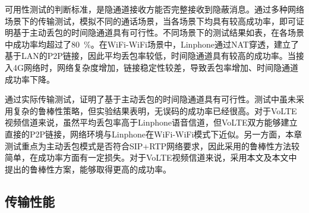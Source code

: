 
可用性测试的判断标准，是隐通道接收方能否完整接收到隐蔽消息。通过多种网络场景下的传输测试，模拟不同的通话场景，当各场景下均具有较高成功率，即可证明基于主动丢包的时间隐通道具有可行性。不同场景下的测试结果如表，在各场景中成功率均超过了{80\ \%}。在WiFi-WiFi场景中，Linphone通过NAT穿透，建立了基于LAN的P2P链接，因此平均丢包率较低，时间隐通道具有较高的成功率。当接入4G网络时，网络复杂度增加，链接稳定性较差，导致丢包率增加、时间隐通道成功率下降。

通过实际传输测试，证明了基于主动丢包的时间隐通道具有可行性。测试中虽未采用复杂的鲁棒性策略，但实验结果表明，无误码的成功率已经很高。对于VoLTE视频信道来说，虽然平均丢包率高于Linphone语音信道，但VoLTE双方能够建立直接的P2P链接，网络环境与Linphone在WiFi-WiFi模式下近似。另一方面，本章测试重点为主动丢包模式是否符合SIP+RTP网络要求，因此采用的鲁棒性方法较简单，在成功率方面有一定损失。对于VoLTE视频信道来说，采用本文及本文中提出的鲁棒性方案，能够取得更高的成功率。

\subsection{传输性能}
\label{chap:linphone:result:throughput}

